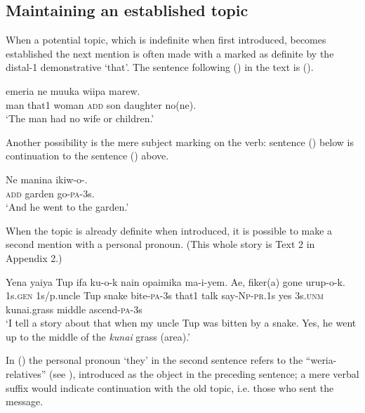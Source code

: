 \subsection{Maintaining an established topic} 

When a potential topic, which is indefinite when first introduced, becomes established the next mention is often made with a  marked as definite by the distal-1 demonstrative  `that'. The sentence  following () in the text is (). 

\ea%
\label{ex:x1673}
\gll {}   emeria  ne  muuka  wiipa  marew.\\
man  that1  woman  \textsc{add}  son  daughter  no(ne).\\
\glt`The man had no wife or children.'
\z


Another possibility is the mere subject marking on the verb: sentence () below is continuation to the sentence () above. 

\ea%
\label{ex:x1674}
\gll Ne  manina  ikiw-o-. \\
\textsc{add}  garden  go-\textsc{pa}-3s.      \\
\glt`And he went to the garden.'
\z


When the topic is already definite when introduced, it is possible to make a second mention with a personal pronoun. (This whole story is Text 2 in Appendix 2.) 

\ea%
\label{ex:x1919}
\gll Yena  yaiya  Tup  ifa  ku-o-k  nain  opaimika ma-i-yem.  Ae,    fiker(a)  gone  urup-o-k. \\
1s.\textsc{gen}  1s/p.uncle  Tup  snake  bite-\textsc{pa}-3s  that1  talk say-\textsc{Np}-\textsc{pr}.1s  yes  3s.\textsc{unm}  kunai.grass  middle  ascend-\textsc{pa}-3s      \\
\glt`I tell a story about that when my uncle Tup was bitten by a snake. Yes, he went up to the middle of the \textit{kunai} grass (area).'
\z


In () the personal pronoun   `they' in the second sentence refers to the ``weria-relatives'' (see ), introduced as the object in the preceding sentence; a mere verbal suffix would indicate continuation with the old topic, i.e. those who sent the message. 

